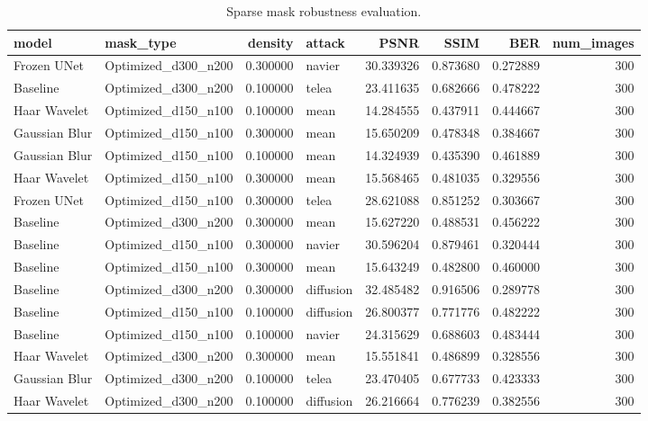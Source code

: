
\begin{table}[h]
\centering

\caption{Sparse mask robustness evaluation.}

\label{tab:sparse_mask_results}

\begin{tabular}{llrlrrrr}
\toprule
model & mask\_type & density & attack & PSNR & SSIM & BER & num\_images \\
\midrule
Frozen UNet & Optimized\_d300\_n200 & 0.300000 & navier & 30.339326 & 0.873680 & 0.272889 & 300 \\
Baseline & Optimized\_d300\_n200 & 0.100000 & telea & 23.411635 & 0.682666 & 0.478222 & 300 \\
Haar Wavelet & Optimized\_d150\_n100 & 0.100000 & mean & 14.284555 & 0.437911 & 0.444667 & 300 \\
Gaussian Blur & Optimized\_d150\_n100 & 0.300000 & mean & 15.650209 & 0.478348 & 0.384667 & 300 \\
Gaussian Blur & Optimized\_d150\_n100 & 0.100000 & mean & 14.324939 & 0.435390 & 0.461889 & 300 \\
Haar Wavelet & Optimized\_d150\_n100 & 0.300000 & mean & 15.568465 & 0.481035 & 0.329556 & 300 \\
Frozen UNet & Optimized\_d150\_n100 & 0.300000 & telea & 28.621088 & 0.851252 & 0.303667 & 300 \\
Baseline & Optimized\_d300\_n200 & 0.300000 & mean & 15.627220 & 0.488531 & 0.456222 & 300 \\
Baseline & Optimized\_d150\_n100 & 0.300000 & navier & 30.596204 & 0.879461 & 0.320444 & 300 \\
Baseline & Optimized\_d150\_n100 & 0.300000 & mean & 15.643249 & 0.482800 & 0.460000 & 300 \\
Baseline & Optimized\_d300\_n200 & 0.300000 & diffusion & 32.485482 & 0.916506 & 0.289778 & 300 \\
Baseline & Optimized\_d150\_n100 & 0.100000 & diffusion & 26.800377 & 0.771776 & 0.482222 & 300 \\
Baseline & Optimized\_d150\_n100 & 0.100000 & navier & 24.315629 & 0.688603 & 0.483444 & 300 \\
Haar Wavelet & Optimized\_d300\_n200 & 0.300000 & mean & 15.551841 & 0.486899 & 0.328556 & 300 \\
Gaussian Blur & Optimized\_d300\_n200 & 0.100000 & telea & 23.470405 & 0.677733 & 0.423333 & 300 \\
Haar Wavelet & Optimized\_d300\_n200 & 0.100000 & diffusion & 26.216664 & 0.776239 & 0.382556 & 300 \\

\end{tabular}
\end{table}

